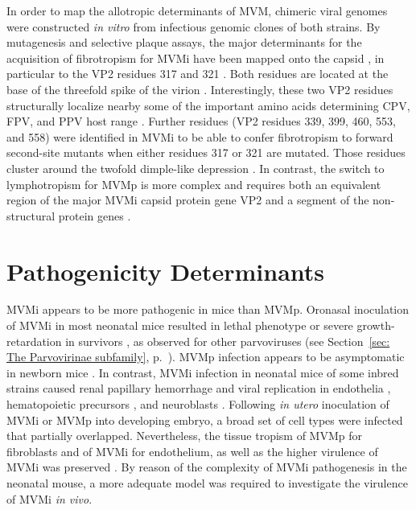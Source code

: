 In order to map the allotropic determinants of MVM, chimeric viral genomes were constructed \textit{in vitro} from infectious genomic clones of both strains. By mutagenesis and selective plaque assays, the major determinants for the acquisition of fibrotropism for MVMi have been mapped onto the capsid \cite{pmid3257270, pmid9519837, pmid1871965}, in particular to the VP2 residues 317 and 321 \cite{pmid7637028, pmid1316457}. Both residues are located at the base of the threefold spike of the virion \cite{pmid3357208, pmid3392768, pmid3257270}. Interestingly, these two VP2 residues structurally localize nearby some of the important amino acids determining CPV, FPV, and PPV host range \cite{pmid14581558, pmid12941920, pmid1532105}. Further residues (VP2 residues 339, 399, 460, 553, and 558) were identified in MVMi to be able to confer fibrotropism to forward second-site mutants when either residues 317 or 321 are mutated. Those residues cluster around the twofold dimple-like depression \cite{pmid9817841}. In contrast, the switch to lymphotropism for MVMp is more complex and requires both an equivalent region of the major MVMi capsid protein gene VP2 and a segment of the non-structural protein genes \cite{pmid9519837}.    


\section{Pathogenicity Determinants}

MVMi appears to be more pathogenic in mice than MVMp. Oronasal inoculation of MVMi in most neonatal mice resulted in lethal phenotype or severe growth-retardation in survivors \cite{pmid3712557}, as observed for other parvoviruses (see Section~\ref{sec: The Parvovirinae subfamily}, p.~\pageref{sec: The Parvovirinae subfamily}). MVMp infection appears to be asymptomatic in newborn mice \cite{pmid1373202}. In contrast, MVMi infection in neonatal mice of some inbred strains caused renal papillary hemorrhage and viral replication in endothelia \cite{pmid1653878}, hematopoietic precursors \cite{pmid7707557}, and neuroblasts \cite{pmid8892936}. Following \textit{in utero} inoculation of MVMi or MVMp into developing embryo, a broad set of cell types were infected that partially overlapped. Nevertheless, the tissue tropism of MVMp for fibroblasts and of MVMi for endothelium, as well as the higher virulence of MVMi was preserved \cite{pmid15308740}. 
By reason of the complexity of MVMi pathogenesis in the neonatal mouse, a more adequate model was required to investigate the virulence of MVMi \textit{in vivo}. 

